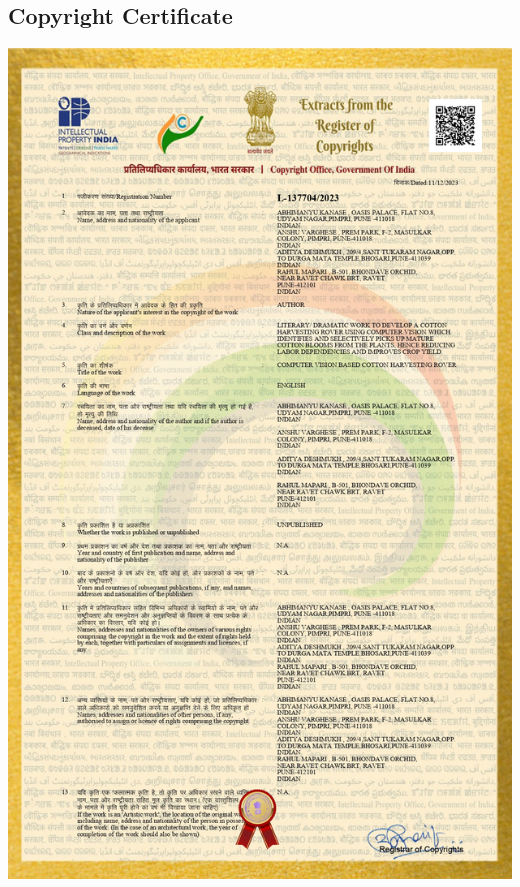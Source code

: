\documentclass[12pt,a4paper]{report}
\begin{document}
\subsection{Copyright Certificate}
\includegraphics[scale =0.6]{images/copyright/copyright_certificate/copyright_certificate_page-0001.jpg}
\newpage
\end{document}
